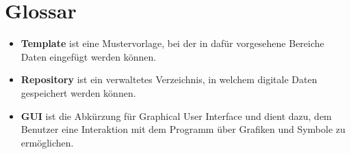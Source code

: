 
\section{Glossar}


\begin{itemize}
	\item \textbf{Template} ist eine Mustervorlage, bei der in dafür vorgesehene Bereiche Daten eingefügt werden können.
	\item \textbf{Repository} ist ein verwaltetes Verzeichnis, in welchem digitale Daten gespeichert werden können.
	\item \textbf{GUI} ist die Abkürzung für Graphical User Interface und dient dazu, dem Benutzer eine Interaktion mit dem Programm über Grafiken und Symbole zu ermöglichen.
\end{itemize}

